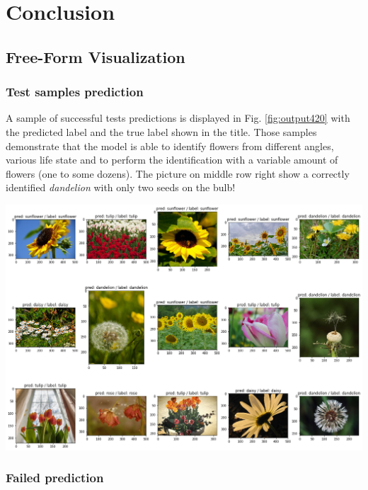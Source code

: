 \newpage
\section{Conclusion}

\subsection{Free-Form Visualization}

\subsubsection{Test samples prediction}

A sample of successful tests predictions is displayed in Fig. \ref{fig:output420} with the predicted label and the true label shown in the title. Those samples demonstrate that the model is able to identify flowers from different angles, various life state and to perform the identification with a variable amount of flowers (one to some dozens). The picture on middle row right show a correctly identified \textit{dandelion} with only two seeds on the bulb! 

\begin{center}
	\includegraphics[scale=.35]{sections/05_conclusion/output_42_0}
	\label{fig:output420}
\end{center}

\subsubsection{Failed  prediction}

